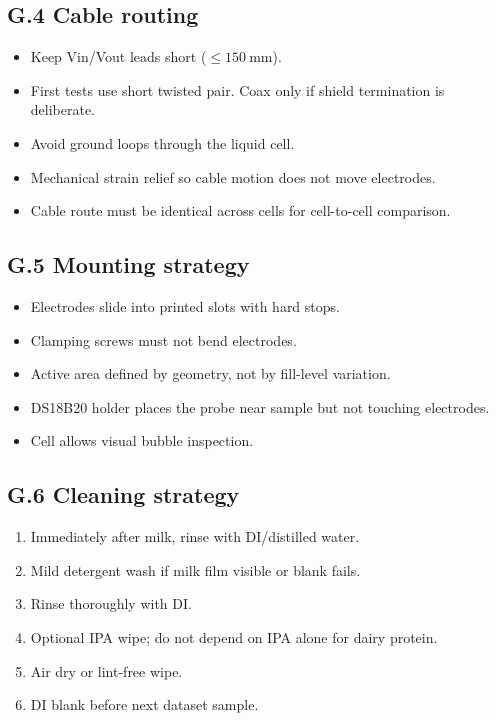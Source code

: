 \documentclass[11pt,a4paper]{article}
\begin{document}
\subsection{G.4 Cable routing}

\begin{itemize}
\item Keep Vin/Vout leads short ($\le \SI{150}{\milli\meter}$).
\item First tests use short twisted pair. Coax only if shield termination is deliberate.
\item Avoid ground loops through the liquid cell.
\item Mechanical strain relief so cable motion does not move electrodes.
\item Cable route must be identical across cells for cell-to-cell comparison.
\end{itemize}

\subsection{G.5 Mounting strategy}

\begin{itemize}
\item Electrodes slide into printed slots with hard stops.
\item Clamping screws must not bend electrodes.
\item Active area defined by geometry, not by fill-level variation.
\item DS18B20 holder places the probe near sample but not touching electrodes.
\item Cell allows visual bubble inspection.
\end{itemize}

\subsection{G.6 Cleaning strategy}

\begin{enumerate}
\item Immediately after milk, rinse with DI/distilled water.
\item Mild detergent wash if milk film visible or blank fails.
\item Rinse thoroughly with DI.
\item Optional IPA wipe; do not depend on IPA alone for dairy protein.
\item Air dry or lint-free wipe.
\item DI blank before next dataset sample.
\end{enumerate}
\end{document}

